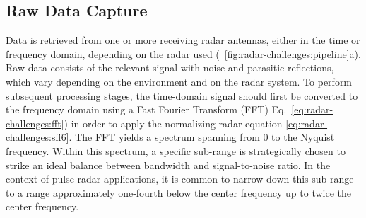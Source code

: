 \subsection{Raw Data Capture} \label{sec:radar-challenges:processing-strategy:data-capture}
Data is retrieved from one or more receiving radar antennas, either in the time or frequency domain, depending on the radar used (\fig~\ref{fig:radar-challenges:pipeline}a). 
Raw data consists of the relevant signal with noise and parasitic reflections, which vary depending on the environment and on the radar system.
To perform subsequent processing stages, the time-domain signal should first be converted to the frequency domain using a Fast Fourier Transform (FFT)  Eq.~\ref{eq:radar-challenges:fft}) in order to apply the normalizing radar equation \ref{eq:radar-challenges:sff6}. The FFT yields a spectrum spanning from 0 to the Nyquist frequency. Within this spectrum, a specific sub-range is strategically chosen to strike an ideal balance between bandwidth and signal-to-noise ratio. In the context of pulse radar applications, it is common to narrow down this sub-range to a range approximately one-fourth below the center frequency up to twice the center frequency.

